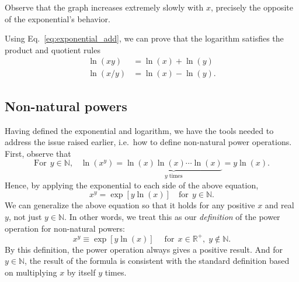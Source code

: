 \documentclass[10pt,a4paper]{article}
\begin{document}
\noindent
Observe that the graph increases extremely slowly with $x$, precisely
the opposite of the exponential's behavior.

Using Eq.~\eqref{eq:exponential_add}, we can prove that the logarithm
satisfies the product and quotient rules
\begin{align}
  \ln(xy) &= \ln(x) + \ln(y) \\
  \ln(x/y) &= \ln(x) - \ln(y).
\end{align}

\subsection{Non-natural powers}
\label{powers}

Having defined the exponential and logarithm, we have the tools needed
to address the issue raised earlier, i.e.~how to define non-natural
power operations. First, observe that
\begin{equation}
  \textrm{For}\;\,y \in \mathbb{N}, \;\;\;\ln(x^y) = \underbrace{\ln(x)\ln(x)\cdots\ln(x)}_{y\;\text{times}} = y \ln(x).
\end{equation}
Hence, by applying the exponential to each side of the above equation,
\begin{equation}
  x^y = \exp[y \ln(x)] \quad \mathrm{for} \;\,y \in \mathbb{N}.
\end{equation}
We can generalize the above equation so that it holds for any positive
$x$ and real $y$, not just $y \in \mathbb{N}$. In other words, we
treat this as our \emph{definition} of the power operation for
non-natural powers:
\begin{equation}
  x^y \equiv \exp[y \ln(x)] \quad\; \mathrm{for}\;\, x \in \mathbb{R}^+, \;y \notin \mathbb{N}.
\end{equation}
By this definition, the power operation always gives a positive result.
And for $y \in \mathbb{N}$, the result of the formula is consistent
with the standard definition based on multiplying $x$ by itself $y$
times.
\end{document}
